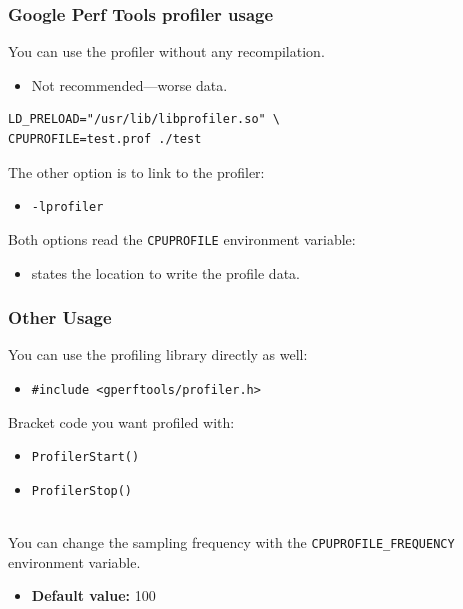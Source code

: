 \begin{frame}[fragile]
  \frametitle{Google Perf Tools profiler usage}

  
\large
\begin{changemargin}{1.5cm}
    You can use the profiler without any recompilation.
      \begin{itemize}
        \item Not recommended---worse data.
      \end{itemize}

  \begin{lstlisting}
LD_PRELOAD="/usr/lib/libprofiler.so" \
CPUPROFILE=test.prof ./test
  \end{lstlisting}

     The other option is to link to the profiler:
      \begin{itemize}
        \item {\tt -lprofiler}
      \end{itemize}
    Both options read the {\tt CPUPROFILE} environment variable:
      \begin{itemize}
        \item states the location to write the profile data.
      \end{itemize}
      \end{changemargin}
\end{frame}

\begin{frame}[fragile]
  \frametitle{Other Usage}

\large
\begin{changemargin}{1.5cm}
  
     You can use the profiling library directly as well:
      \begin{itemize}
        \item {\tt \#include <gperftools/profiler.h>}
      \end{itemize}
     Bracket code you want profiled with:
      \begin{itemize}
        \item {\tt ProfilerStart()}
        \item {\tt ProfilerStop()}
      \end{itemize}~\\
    
    You can change the sampling frequency with the
      {\tt CPUPROFILE\_FREQUENCY} environment variable.
      \begin{itemize}
        \item {\bf Default value:} 100
      \end{itemize}
      \end{changemargin}
\end{frame}

